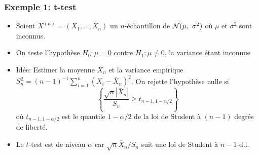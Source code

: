 \begin{frame}
\frametitle{Exemple 1: t-test}
\begin{itemize}
\item  Soient $X^{(n)}= (X_{1}, \dots, X_{n})$ un $n$-échantillon de $\mathcal{N}(\mu,\ \sigma^{2})$ où \alert{$\mu$ et $\sigma^2$ sont inconnus}.
\item On teste l'hypothèse $H_0: \mu =0$ contre $H_1: \mu \ne 0$, la variance étant inconnue
\item \alert{Idée}: Estimer la moyenne $\bar{X}_n$ et la variance empirique $S_n^{2} = (n-1)^{-1} \sum_{i=1}^n (X_i- \bar{X}_n)^2$. On rejette l'hypothèse nulle si 
    \[
    \left\{ \frac{\sqrt{n}|\bar{X}_n|}{S_n} \geq t_{n-1,1-\alpha/2} \right\}
    \]
    où $t_{n-1,1-\alpha/2}$ est le quantile $1-\alpha/2$ de la loi de Student à $(n-1)$ degrés de liberté. 
\item Le $t$-test est de niveau $\alpha$ car $\sqrt{n}\bar{X}_n/S_n$ suit une loi de Student à $n-1$-d.l.
\end{itemize}
\end{frame}


